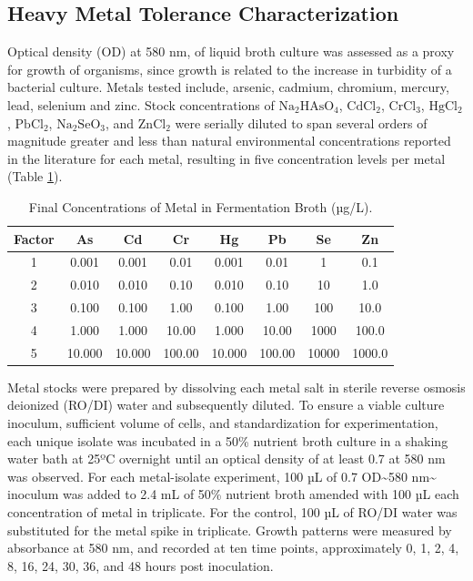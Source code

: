 \documentclass[ms, hidelinks]{uncgdissertationexp}
\theoremstyle{plain}
\theoremstyle{definition}
\theoremstyle{remark}
\begin{document}
\hypertarget{heavy-metal-tolerance-characterization}{%
\subsection{Heavy Metal Tolerance Characterization}\label{heavy-metal-tolerance-characterization}}

Optical density (OD) at 580 nm, of liquid broth culture was assessed as a proxy for growth of organisms, since growth is related to the increase in turbidity of a bacterial culture. Metals tested include, arsenic, cadmium, chromium, mercury, lead, selenium and zinc. Stock concentrations of \(\mathrm{Na_2HAsO_4}\), \(\mathrm{CdCl_2}\), \(\mathrm{CrCl_3}\), \(\mathrm{HgCl_2}\), \(\mathrm{PbCl_2}\), \(\mathrm{Na_2SeO_3}\), and \(\mathrm{ZnCl_2}\) were serially diluted to span several orders of magnitude greater and less than natural environmental concentrations reported in the literature for each metal, resulting in five concentration levels per metal (Table \ref{tab:metals}).
\begin{table}[htbp]
\caption[Final Concentrations of Metal in Fermentation Broth.]{Final Concentrations of Metal in Fermentation Broth (µg/L).}\label{tab:metals}
\centering
\begin{tabular}{cccccccc}
\toprule
Factor & As & Cd & Cr & Hg & Pb & Se & Zn\\
\midrule
1 & 0.001 & 0.001 & 0.01 & 0.001 & 0.01 & 1 & 0.1\\
2 & 0.010 & 0.010 & 0.10 & 0.010 & 0.10 & 10 & 1.0\\
3 & 0.100 & 0.100 & 1.00 & 0.100 & 1.00 & 100 & 10.0\\
4 & 1.000 & 1.000 & 10.00 & 1.000 & 10.00 & 1000 & 100.0\\
5 & 10.000 & 10.000 & 100.00 & 10.000 & 100.00 & 10000 & 1000.0\\
\bottomrule
\end{tabular}
\end{table}

Metal stocks were prepared by dissolving each metal salt in sterile reverse osmosis deionized (RO/DI) water and subsequently diluted. To ensure a viable culture inoculum, sufficient volume of cells, and standardization for experimentation, each unique isolate was incubated in a 50\% nutrient broth culture in a shaking water bath at 25ºC overnight until an optical density of at least 0.7 at 580 nm was observed. For each metal-isolate experiment, 100 µL of 0.7 OD\textasciitilde580 nm\textasciitilde{} inoculum was added to 2.4 mL of 50\% nutrient broth amended with 100 µL each concentration of metal in triplicate. For the control, 100 µL of RO/DI water was substituted for the metal spike in triplicate. Growth patterns were measured by absorbance at 580 nm, and recorded at ten time points, approximately 0, 1, 2, 4, 8, 16, 24, 30, 36, and 48 hours post inoculation.
\end{document}
